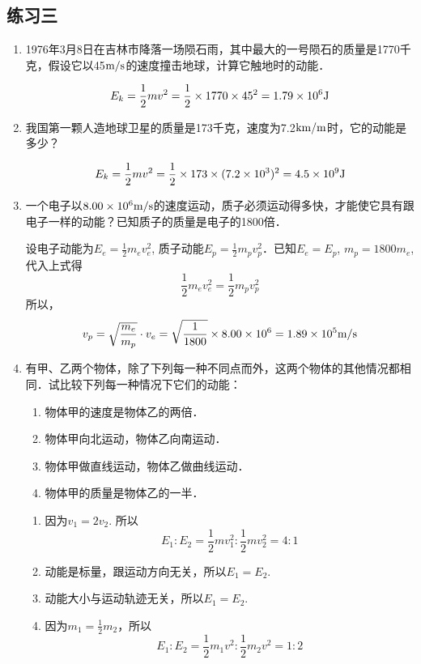 \subsection{练习三}
\begin{enumerate}
    \item 1976年3月8日在吉林市降落一场陨石雨，其中最大的一号陨石的质量是1770千克，假设它以45$\text{m}/\text{s}$的速度撞击地球，计算它触地时的动能．

    \begin{solution}
\[E_k=\frac{1}{2}mv^2=\frac{1}{2}\times 1770\times 45^2=1.79\times 10^6{\rm J}\]
    \end{solution}
    \item 我国第一颗人造地球卫星的质量是173千克，速度为7.2${\rm km}/{\rm m}$时，它的动能是多少？

    \begin{solution}
    \[E_k=\frac{1}{2}mv^2=\frac{1}{2}\times 173\times (7.2\times 10^3)^2=4.5\times 10^9{\rm J}\]
    \end{solution}
    \item 一个电子以$8.00\times 10^6\text{m}/\text{s}$的速度运动，质子必须运动得多快，才能使它具有跟电子一样的动能？已知质子的质量是电子的1800倍．

    \begin{solution}
设电子动能为$E_e=\frac{1}{2}m_e v_e^2$, 质子动能$E_p=\frac{1}{2}m_pv_p^2$．已知$E_e=E_p$, $m_p=1800m_e$, 代入上式得
\[\frac{1}{2}m_e v_e^2=\frac{1}{2}m_p v_p^2\]
所以，
\[v_p=\sqrt{\frac{m_e}{m_p}}\cdot v_e=\sqrt{\frac{1}{1800}}\times 8.00\times 10^6=1.89\times 10^5\text{m}/\text{s}\]
    \end{solution}
    \item 有甲、乙两个物体，除了下列每一种不同点而外，这两个物体的其他情况都相同．试比较下列每一种情况下它们的动能：
    \begin{enumerate}
        \item 物体甲的速度是物体乙的两倍．
        \item 物体甲向北运动，物体乙向南运动．
        \item 物体甲做直线运动，物体乙做曲线运动．
        \item 物体甲的质量是物体乙的一半．
    \end{enumerate}

    \begin{solution}
\begin{enumerate}
    \item 因为$v_1=2v_2$. 所以
    \[E_1:E_2=\frac{1}{2}mv_1^2 :\frac{1}{2}mv_2^2=4:1\]
    \item 动能是标量，跟运动方向无关，所以$E_1=E_2$.
    \item 动能大小与运动轨迹无关，所以$E_1=E_2$.
    \item 因为$m_1=\frac{1}{2}m_2$，所以
    \[E_1:E_2=\frac{1}{2}m_1v^2 :\frac{1}{2}m_2v^2=1:2\]
\end{enumerate}
    \end{solution}
\end{enumerate}




